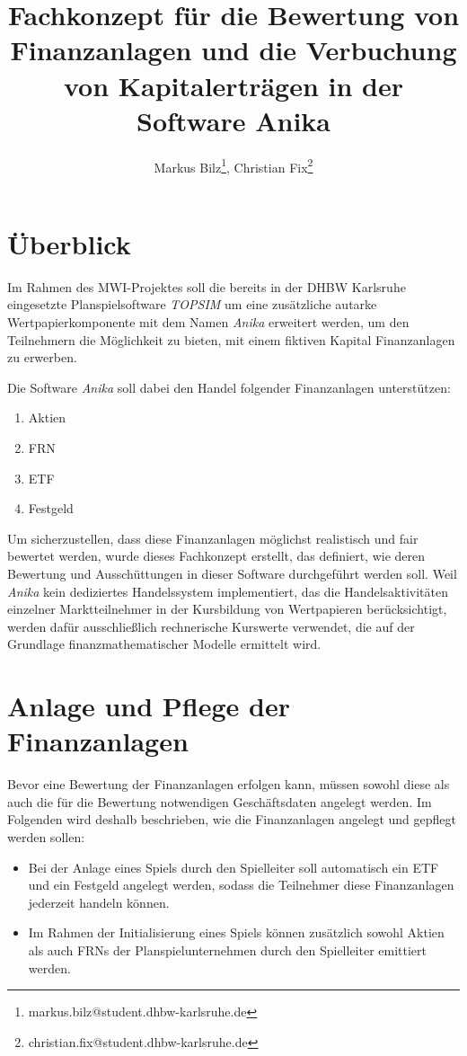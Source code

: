 \documentclass[12pt, a4paper]{article}
\title{Fachkonzept für die Bewertung von Finanzanlagen und die Verbuchung von Kapitalerträgen in der Software Anika}
\author{Markus Bilz\thanks{markus.bilz@student.dhbw-karlsruhe.de}, Christian Fix\thanks{christian.fix@student.dhbw-karlsruhe.de}}
\theoremstyle{plain}
\begin{document}
\maketitle

\section{Überblick}
Im Rahmen des MWI-Projektes soll die bereits in der DHBW Karlsruhe eingesetzte Planspielsoftware \textit{TOPSIM} um eine zusätzliche autarke Wertpapierkomponente mit dem Namen \textit{Anika} erweitert werden, um den Teilnehmern die Möglichkeit zu bieten, mit einem fiktiven Kapital Finanzanlagen zu erwerben.

Die Software \textit{Anika} soll dabei den Handel folgender Finanzanlagen unterstützen:
\begin{enumerate}
	\item Aktien
	\item \gls{FRN}
	\item \gls{ETF}
	\item Festgeld
\end{enumerate}

Um sicherzustellen, dass diese Finanzanlagen möglichst realistisch und fair bewertet werden, wurde dieses Fachkonzept erstellt, das definiert, wie deren Bewertung und Ausschüttungen in dieser Software durchgeführt werden soll.
Weil \textit{Anika} kein dediziertes Handelssystem implementiert, das die Handelsaktivitäten einzelner Marktteilnehmer in der Kursbildung von Wertpapieren berücksichtigt, werden dafür ausschließlich rechnerische Kurswerte verwendet, die auf der Grundlage finanzmathematischer Modelle ermittelt wird.


\section{Anlage und Pflege der Finanzanlagen}
\label{sec:anlage_und_pflege_der_wertpapiere}

Bevor eine Bewertung der Finanzanlagen erfolgen kann, müssen sowohl diese als auch die für die Bewertung notwendigen Geschäftsdaten angelegt werden. 
Im Folgenden wird deshalb beschrieben, wie die Finanzanlagen angelegt und gepflegt werden sollen:
\begin{itemize}
	\item Bei der Anlage eines Spiels durch den Spielleiter soll automatisch ein \gls{ETF} und ein Festgeld angelegt werden, sodass die Teilnehmer diese Finanzanlagen jederzeit handeln können.
	\item Im Rahmen der Initialisierung eines Spiels können zusätzlich sowohl Aktien als auch \glspl{FRN} der Planspielunternehmen durch den Spielleiter emittiert werden.  
\end{itemize}
\end{document}
